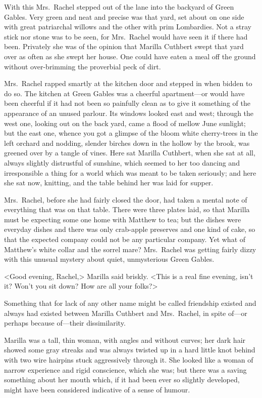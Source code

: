 With this Mrs.~Rachel stepped out of the lane into the backyard of Green Gables. Very green and neat and precise was that yard, set about on one side with great patriarchal willows and the other with prim Lombardies. Not a stray stick nor stone was to be seen, for Mrs.~Rachel would have seen it if there had been. Privately she was of the opinion that Marilla Cuthbert swept that yard over as often as she swept her house. One could have eaten a meal off the ground without over-brimming the proverbial peck of dirt.

Mrs.~Rachel rapped smartly at the kitchen door and stepped in when bidden to do so. The kitchen at Green Gables was a cheerful apartment—or would have been cheerful if it had not been so painfully clean as to give it something of the appearance of an unused parlour. Its windows looked east and west; through the west one, looking out on the back yard, came a flood of mellow June sunlight; but the east one, whence you got a glimpse of the bloom white cherry-trees in the left orchard and nodding, slender birches down in the hollow by the brook, was greened over by a tangle of vines. Here sat Marilla Cuthbert, when she sat at all, always slightly distrustful of sunshine, which seemed to her too dancing and irresponsible a thing for a world which was meant to be taken seriously; and here she sat now, knitting, and the table behind her was laid for supper.

Mrs.~Rachel, before she had fairly closed the door, had taken a mental note of everything that was on that table. There were three plates laid, so that Marilla must be expecting some one home with Matthew to tea; but the dishes were everyday dishes and there was only crab-apple preserves and one kind of cake, so that the expected company could not be any particular company. Yet what of Matthew's white collar and the sorrel mare? Mrs.~Rachel was getting fairly dizzy with this unusual mystery about quiet, unmysterious Green Gables.

<Good evening, Rachel,> Marilla said briskly. <This is a real fine evening, isn't it? Won't you sit down? How are all your folks?>

Something that for lack of any other name might be called friendship existed and always had existed between Marilla Cuthbert and Mrs.~Rachel, in spite of—or perhaps because of—their dissimilarity.

Marilla was a tall, thin woman, with angles and without curves; her dark hair showed some gray streaks and was always twisted up in a hard little knot behind with two wire hairpins stuck aggressively through it. She looked like a woman of narrow experience and rigid conscience, which she was; but there was a saving something about her mouth which, if it had been ever so slightly developed, might have been considered indicative of a sense of humour.

